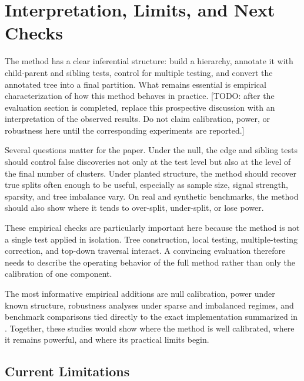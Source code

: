 
\section{Interpretation, Limits, and Next Checks}

The method has a clear inferential structure: build a hierarchy, annotate it
with child-parent and sibling tests, control for multiple testing, and convert
the annotated tree into a final partition. What remains essential is empirical
characterization of how this method behaves in practice.
[TODO: after the evaluation section is completed, replace this prospective
discussion with an interpretation of the observed results. Do not claim
calibration, power, or robustness here until the corresponding experiments are
reported.]

Several questions matter for the paper. Under the null, the edge and
sibling tests should control false discoveries not only at the test level but
also at the level of the final number of clusters. Under planted structure,
the method should recover true splits often enough to be useful, especially as
sample size, signal strength, sparsity, and tree imbalance vary. On real and
synthetic benchmarks, the method should also show where it tends to over-split,
under-split, or lose power.

These empirical checks are particularly important here because the method is
not a single test applied in isolation. Tree construction, local testing,
multiple-testing correction, and top-down traversal interact. A convincing
evaluation therefore needs to describe the operating behavior of the full
method rather than only the calibration of one component.

The most informative empirical additions are null calibration, power under
known structure, robustness analyses under sparse and imbalanced regimes, and
benchmark comparisons tied directly to the exact implementation summarized in
. Together, these studies would show where the method
is well calibrated, where it remains powerful, and where its practical limits
begin.

\subsection{Current Limitations}

